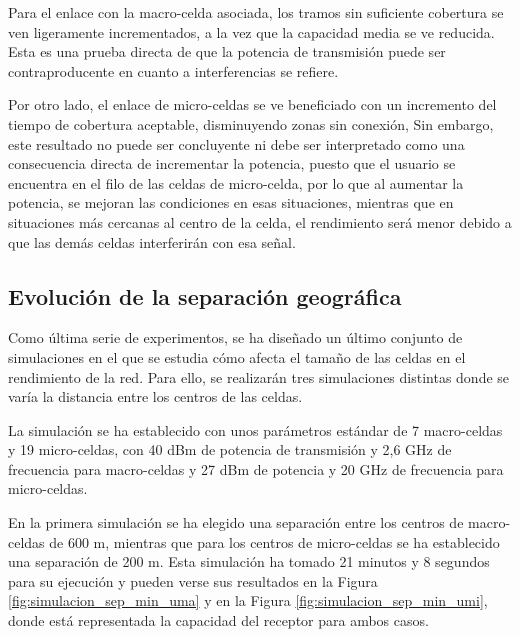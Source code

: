 Para el enlace con la macro-celda asociada, los tramos sin suficiente cobertura se ven ligeramente incrementados, a la vez que la capacidad media se ve reducida. Esta es una prueba directa de que la potencia de transmisión puede ser contraproducente en cuanto a interferencias se refiere.

Por otro lado, el enlace de micro-celdas se ve beneficiado con un incremento del tiempo de cobertura aceptable, disminuyendo zonas sin conexión, Sin embargo, este resultado no puede ser concluyente ni debe ser interpretado como una consecuencia directa de incrementar la potencia, puesto que el usuario se encuentra en el filo de las celdas de micro-celda, por lo que al aumentar la potencia, se mejoran las condiciones en esas situaciones, mientras que en situaciones más cercanas al centro de la celda, el rendimiento será menor debido a que las demás celdas interferirán con esa señal.

\subsection{Evolución de la separación geográfica}

Como última serie de experimentos, se ha diseñado un último conjunto de simulaciones en el que se estudia cómo afecta el tamaño de las celdas en el rendimiento de la red. Para ello, se realizarán tres simulaciones distintas donde se varía la distancia entre los centros de las celdas.

La simulación se ha establecido con unos parámetros estándar de 7 macro-celdas y 19 micro-celdas, con 40 dBm de potencia de transmisión y 2,6 GHz de frecuencia para macro-celdas y 27 dBm de potencia y 20 GHz de frecuencia para micro-celdas.

En la primera simulación se ha elegido una separación entre los centros de macro-celdas de 600 m, mientras que para los centros de micro-celdas se ha establecido una separación de 200 m. Esta simulación ha tomado 21 minutos y 8 segundos para su ejecución y pueden verse sus resultados en la Figura \ref{fig:simulacion_sep_min_uma} y en la Figura \ref{fig:simulacion_sep_min_umi}, donde está representada la capacidad del receptor para ambos casos.

